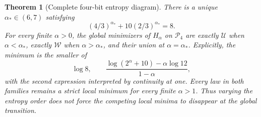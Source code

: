 \documentclass[11pt]{article}
\newtheorem{theorem}{Theorem}[section]
\begin{document}
\begin{theorem}[Complete four-bit entropy diagram]\label{thm:renyi-phase}
There is a unique $\alpha_*\in(6,7)$ satisfying
\[
 (4/3)^{\alpha_*}+10(2/3)^{\alpha_*}=8.
\]
For every finite $\alpha>0$, the global minimizers of $H_\alpha$ on
$\mathcal P_4$ are exactly $\mathcal U$ when $\alpha<\alpha_*$,
exactly $\mathcal W$ when $\alpha>\alpha_*$, and their union at
$\alpha=\alpha_*$. Explicitly, the minimum is the smaller of
\[
 \log8,\qquad
 \frac{\log(2^\alpha+10)-\alpha\log12}{1-\alpha},
\]
with the second expression interpreted by continuity at one.
Every law in both families remains a strict local minimum for every
finite $\alpha>1$. Thus varying the entropy order does not force
the competing local minima to disappear at the global transition.
\end{theorem}
\end{document}
